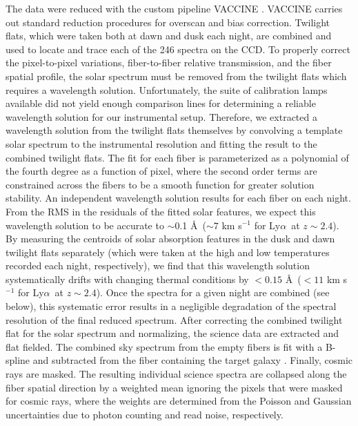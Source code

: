\documentclass{emulateapj}
\newcommand{\lya}{Ly$\alpha$}
\begin{document}
The data were reduced with the custom pipeline VACCINE \citep{adams2011}. VACCINE carries out standard reduction procedures for overscan and bias correction. Twilight flats, which were taken both at dawn and dusk each night, are combined and used to locate and trace each of the 246 spectra on the CCD. To properly correct the pixel-to-pixel variations, fiber-to-fiber relative transmission, and the fiber spatial profile, the solar spectrum must be removed from the twilight flats which requires a wavelength solution. Unfortunately, the suite of calibration lamps available did not yield enough comparison lines for determining a reliable wavelength solution for our instrumental setup. Therefore, we extracted a wavelength solution from the twilight flats themselves by convolving a template solar spectrum \citep{kurucz1984} to the instrumental resolution and fitting the result to the combined twilight flats. The fit for each fiber is parameterized as a polynomial of the fourth degree as a function of pixel, where the second order terms are constrained across the fibers to be a smooth function for greater solution stability. An independent wavelength solution results for each fiber on each night. From the RMS in the residuals of the fitted solar features, we expect this wavelength solution to be accurate to $\sim$0.1 \AA\ ($\sim7$ km s$^{-1}$ for \lya\ at $z\sim2.4$). By measuring the centroids of solar absorption features in the dusk and dawn twilight flats separately (which were taken at the high and low temperatures recorded each night, respectively), we find that this wavelength solution systematically drifts with changing thermal conditions by $<0.15$ \AA\ ($<11$ km s$^{-1}$ for \lya\ at $z\sim2.4$). Once the spectra for a given night are combined (see below), this systematic error results in a negligible degradation of the spectral resolution of the final reduced spectrum. After correcting the combined twilight flat for the solar spectrum and normalizing, the science data are extracted and flat fielded. The combined sky spectrum from the empty fibers is fit with a B-spline and subtracted from the fiber containing the target galaxy \citep{dierckx1993,kelson2003}. Finally, cosmic rays are masked. The resulting individual science spectra are collapsed along the fiber spatial direction by a weighted mean ignoring the pixels that were masked for cosmic rays, where the weights are determined from the Poisson and Gaussian uncertainties due to photon counting and read noise, respectively.
\end{document}
